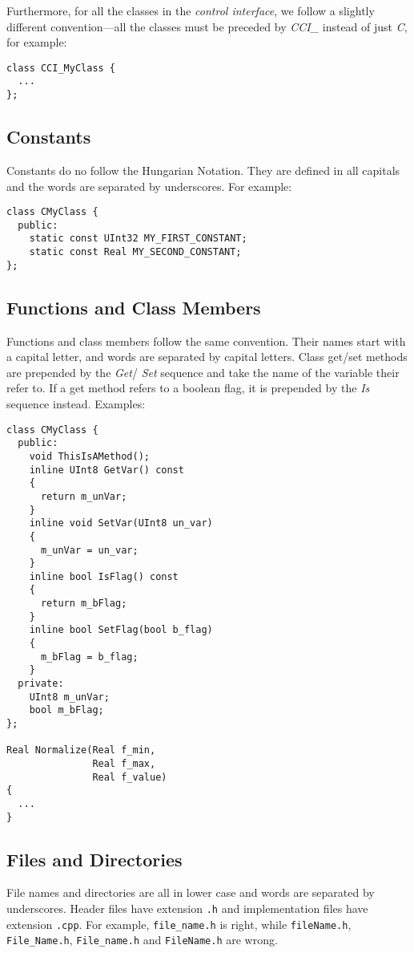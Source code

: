 \documentclass[a4paper]{article}
\begin{document}
Furthermore, for all the classes in the {\it control interface}, we follow a
slightly different convention---all the classes must be preceded
by {\it CCI\_} instead of just {\it C}, for example:
\begin{lstlisting}
class CCI_MyClass {
  ...
};
\end{lstlisting}

\subsection{Constants}
\label{subsec:constants}
Constants do no follow the Hungarian Notation. They are defined in all
capitals and the words are separated by underscores. For example:
\begin{lstlisting}
class CMyClass {
  public:
    static const UInt32 MY_FIRST_CONSTANT;
    static const Real MY_SECOND_CONSTANT;
};
\end{lstlisting}

\subsection{Functions and Class Members}
\label{subsec:functions}
Functions and class members follow the same convention. Their names
start with a capital letter, and words are separated by capital
letters. Class get/set methods are prepended by the {\it Get}/{\it
Set} sequence and take the name of the variable their refer to. If a
get method refers to a boolean flag, it is prepended by the {\it Is}
sequence instead. Examples:
\begin{lstlisting}
class CMyClass {
  public:
    void ThisIsAMethod();
    inline UInt8 GetVar() const
    {
      return m_unVar;
    }
    inline void SetVar(UInt8 un_var)
    {
      m_unVar = un_var;
    }
    inline bool IsFlag() const
    {
      return m_bFlag;
    }
    inline bool SetFlag(bool b_flag)
    {
      m_bFlag = b_flag;
    }
  private:
    UInt8 m_unVar;
    bool m_bFlag;
};

Real Normalize(Real f_min,
               Real f_max,
               Real f_value)
{
  ...
}
\end{lstlisting}

\subsection{Files and Directories}
\label{subsec:files}
File names and directories are all in lower case and words are
separated by underscores. Header files have extension \verb!.h! and
implementation files have extension \verb!.cpp!.  For example,
\verb!file_name.h! is right, while \verb!fileName.h!,
\verb!File_Name.h!, \verb!File_name.h!  and \verb!FileName.h! are
wrong.
\end{document}
